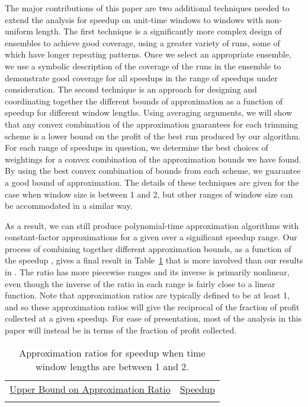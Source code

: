 \documentclass[11pt]{article}
\begin{document}
The major contributions of this paper are two additional techniques needed to extend the analysis for speedup on unit-time windows to windows with non-uniform length.  The first technique is a significantly more complex design of ensembles to achieve good coverage, using a greater variety of runs, some of which have longer repeating patterns.  Once we select an appropriate ensemble, we use a symbolic description of the coverage of the runs in the ensemble to demonstrate good coverage for all speedups in the range of speedups under consideration.  The second technique is an approach for designing and coordinating together the different bounds of approximation as a function of speedup for different window lengths.  Using averaging arguments, we will show that any convex combination of the approximation guarantees for each trimming scheme is a lower bound on the profit of the best run produced by our algorithm.  For each range of speedups in question, we determine the best choices of weightings for a convex combination of the approximation bounds we have found.  By using the best convex combination of bounds from each scheme, we guarantee a good bound of approximation.  The details of these techniques are given for the case when window size is between 1 and 2, but other ranges of window size can be accommodated in a similar way.

As a result, we can still produce polynomial-time approximation algorithms with constant-factor approximations for a given  over a significant speedup range.
Our process of combining together different approximation bounds, as a function of the speedup , gives a final result in Table~\ref{table:speedupw12rats} that is more involved than our results in \cite{Frederickson5}.  The ratio has more piecewise ranges and its inverse is primarily nonlinear, even though the inverse of the ratio in each range is fairly close to a linear function.  Note that approximation ratios are typically defined to be at least 1, and so these approximation ratios will give the reciprocal of the fraction of profit collected at a given speedup.  For ease of presentation, most of the analysis in this paper will instead be in terms of the fraction of profit collected.

\medskip

\begin{table}[!hbt]
\begin{center}
\begin{tabular}{cc}
\underline{Upper Bound on Approximation Ratio} & \underline{Speedup} \medskip \\
 &

\end{tabular}\\
\caption{Approximation ratios for speedup  when time window lengths are between 1 and 2.}
\label{table:speedupw12rats}
\end{center}
\end{table}
\end{document}
